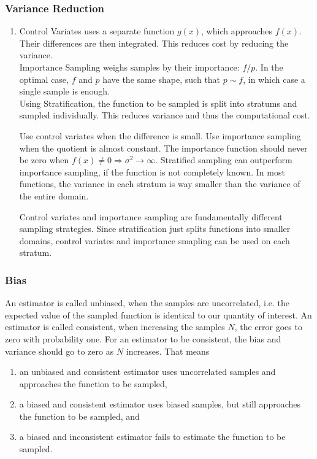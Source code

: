 \subsubsection{Variance Reduction}

\begin{enumerate}
\item
Control Variates uses a separate function $g(x)$, which approaches $f(x)$. Their differences are then integrated. This reduces cost by reducing the variance. \\
Importance Sampling weighs samples by their importance: $f/p$. In the optimal case, $f$ and $p$ have the same shape, such that $p\sim f$, in which case a single sample is enough. \\ 
Using Stratification, the function to be sampled is split into stratums and sampled individually. This reduces variance and thus the computational cost.

Use control variates when the difference is small. Use importance sampling when the quotient is almost constant. The importance function should never be zero when $f(x) \ne 0 \Rightarrow \sigma^2 \rightarrow \infty$. Stratified sampling can outperform importance sampling, if the function is not completely known. In most functions, the variance in each stratum is way smaller than the variance of the entire domain.

Control variates and importance sampling are fundamentally different sampling strategies. Since stratification just splits functions into smaller domains, control variates and importance smapling can be used on each stratum.
\end{enumerate}

\subsubsection{Bias}

An estimator is called unbiased, when the samples are uncorrelated, i.e. the expected value of the sampled function is identical to our quantity of interest. An estimator is called consistent, when increasing the samples $N$, the error goes to zero with probability one. For an estimator to be consistent, the bias and variance should go to zero as $N$ increases. That means

\begin{enumerate}
\item an unbiased and consistent estimator uses uncorrelated samples and approaches the function to be sampled,
\item a biased and consistent estimator uses biased samples, but still approaches the function to be sampled, and
\item a biased and inconsistent estimator fails to estimate the function to be sampled.
\end{enumerate}